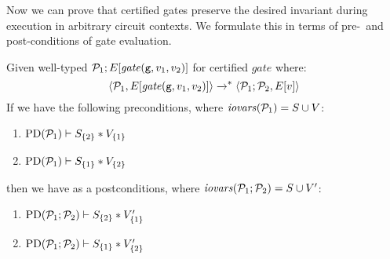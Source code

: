 Now we can prove that certified gates preserve the desired invariant
during execution in arbitrary circuit contexts.
We formulate this in terms of pre-~and post-conditions of gate
evaluation.
\begin{lemma}
  \label{lemma-gmw-preservation}
  Given well-typed $\mathcal{P}_1;E[\mathit{gate}(\texttt{g},v_1,v_2)]$ for certified $\mathit{gate}$ where:
  $$
  \langle \mathcal{P}_1,E[\mathit{gate}(\texttt{g},v_1,v_2)] \rangle \xrightarrow{}^{*} \langle \mathcal{P}_1;\mathcal{P}_2,E[v] \rangle
  $$
  If we have the following preconditions, where $\mathit{iovars}(\mathcal{P}_1) = S \cup V$:
  \begin{enumerate}[\hspace{5mm}i.]
  \item $\mathrm{PD}(\mathcal{P}_1) \vdash S_{\{2\}} * V_{\{1\}}$
  \item $\mathrm{PD}(\mathcal{P}_1) \vdash S_{\{1\}} * V_{\{2\}}$
  \end{enumerate}
  then we have as a postconditions, where $\mathit{iovars}(\mathcal{P}_1;\mathcal{P}_2) = S \cup V'$:
  \begin{enumerate}[\hspace{5mm}i.]
  \item $\mathrm{PD}(\mathcal{P}_1;\mathcal{P}_2) \vdash S_{\{2\}} * V'_{\{1\}}$
  \item $\mathrm{PD}(\mathcal{P}_1;\mathcal{P}_2) \vdash S_{\{1\}} * V'_{\{2\}}$
  \end{enumerate}
\end{lemma}

